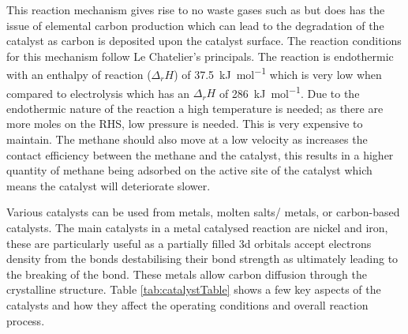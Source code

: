 This reaction mechanism gives rise to no waste gases such as  but does has the issue of elemental carbon production which can lead to the degradation of the catalyst as carbon is deposited upon the catalyst surface.
The reaction conditions for this mechanism follow Le Chatelier’s principals.
The reaction is endothermic with an enthalpy of reaction ($\Delta_{r}H$) of \SI{+37.5}{\kilo\joule\per\mole} which is very low when compared to electrolysis which has an $\Delta_{r}H$ of \SI{+286}{\kilo\joule\per\mole}\cite{SBN2020}.
Due to the endothermic nature of the reaction a high temperature is needed; as there are more moles on the RHS, low pressure is needed.
This is very expensive to maintain.
The methane should also move at a low velocity as increases the contact efficiency between the methane and the catalyst, this results in a higher quantity of methane being adsorbed on the active site of the catalyst which means the catalyst will deteriorate slower.

Various catalysts can be used from metals, molten salts/ metals, or carbon-based catalysts.
The main catalysts in a metal catalysed reaction are nickel and iron, these are particularly useful as a partially filled 3d orbitals accept electrons density from the  bonds destabilising their bond strength as ultimately leading to the breaking of the bond.
These metals allow carbon diffusion through the crystalline structure.
Table \ref{tab:catalystTable} shows a few key aspects of the catalysts and how they affect the operating conditions and overall reaction process.

